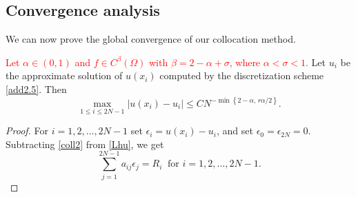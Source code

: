\documentclass[smallextended]{svjour3}       %
\newcommand{\tcr}[1]{\textcolor{red}{#1}}
\begin{document}
%
%
\subsection{Convergence analysis}
We can now prove the global convergence  of our collocation method.


\begin{theorem}\label{thm:globalcgce}
\tcr{Let $\alpha\in(0,1)$ and $f\in C^\beta(\Omega)$ with $\beta = 2-\alpha+\sigma$, where $\alpha < \sigma < 1$.} 
Let $u_{i}$ be the approximate solution of $u(x_{i})$ computed by the discretization scheme \eqref{add2.5}. 
 Then
\[
\max_{1\leq i \leq 2N-1} |u(x_{i})-u_{i}| \le C N^{-\min\left\{2-\alpha,\,r\alpha/2\right\}}.
\]
\end{theorem}
\begin{proof}
For $i=1,2,\dots,2N-1$ set $\epsilon_{i} = u(x_{i})-u_{i}$, and set $\epsilon_{0} = \epsilon_{2N} = 0$. 
Subtracting \eqref{coll2} from \eqref{Lhu}, we get
	\begin{equation}\label{adnequ31}
		\sum_{j=1}^{2N-1} a_{i j}\epsilon_j=R_i \ \text{ for }i=1,2,\dots,2N-1.
	\end{equation}
	

\end{proof}
\end{document}
